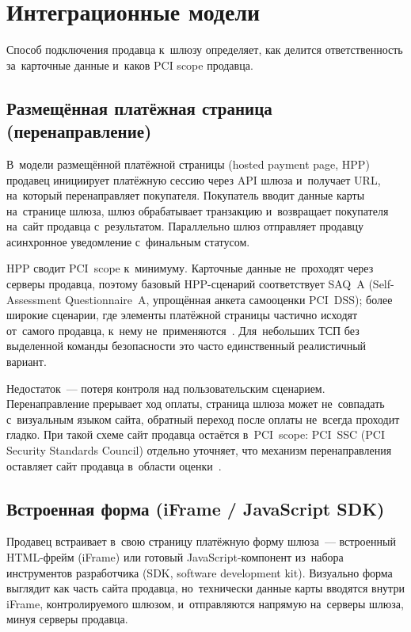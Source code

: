 
\section{Интеграционные модели}\label{sec:gw-integration}

Способ подключения продавца к~шлюзу определяет, как делится ответственность
за~карточные данные и~каков PCI scope продавца.

\subsection*{Размещённая платёжная страница (перенаправление)}

В~модели размещённой платёжной страницы (hosted payment page, HPP) продавец
инициирует платёжную сессию через API шлюза и~получает URL, на~который
перенаправляет покупателя. Покупатель вводит данные карты на~странице шлюза,
шлюз обрабатывает транзакцию и~возвращает покупателя на~сайт продавца
с~результатом. Параллельно шлюз отправляет продавцу асинхронное уведомление
с~финальным статусом.

HPP сводит PCI~scope к~минимуму. Карточные данные не~проходят через серверы
продавца, поэтому базовый HPP-сценарий соответствует SAQ~A (Self-Assessment
Questionnaire~A, упрощённая анкета самооценки PCI~DSS); более широкие сценарии,
где элементы платёжной страницы частично исходят от~самого продавца, к~нему
не~применяются~\cite{pci-faq-1291,pci-faq-1293}. Для~небольших ТСП без
выделенной команды безопасности это часто единственный реалистичный вариант.

Недостаток~--- потеря контроля над пользовательским сценарием. Перенаправление
прерывает ход оплаты, страница шлюза может не~совпадать с~визуальным языком
сайта, обратный переход после оплаты не~всегда проходит гладко. При такой схеме
сайт продавца остаётся в~PCI~scope: PCI~SSC (PCI Security Standards Council)
отдельно уточняет, что механизм перенаправления оставляет сайт продавца в~области
оценки~\cite{pci-faq-1332}.

\subsection*{Встроенная форма (iFrame / JavaScript SDK)}

Продавец встраивает в~свою страницу платёжную форму шлюза~--- встроенный
HTML-фрейм (iFrame) или готовый JavaScript-компонент из~набора инструментов
разработчика (SDK, software development kit). Визуально форма выглядит как
часть сайта продавца, но~технически данные карты вводятся внутри iFrame,
контролируемого шлюзом, и~отправляются напрямую на~серверы шлюза, минуя серверы
продавца.

